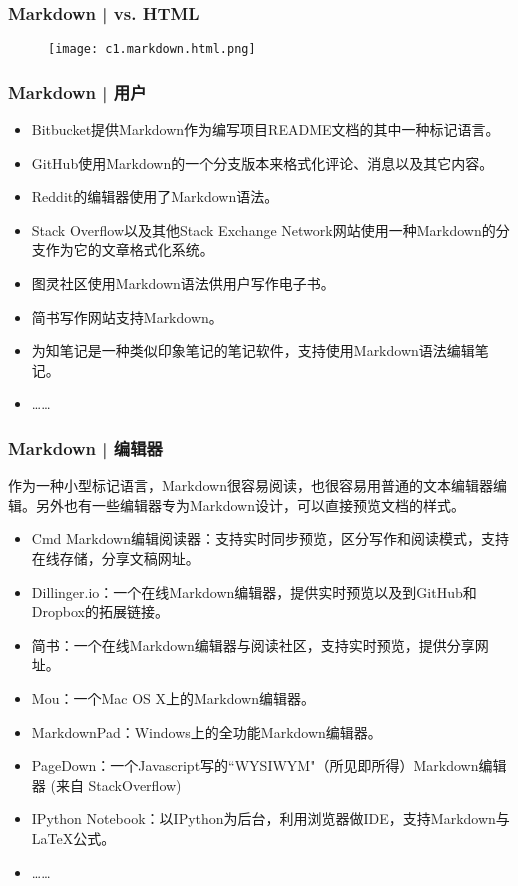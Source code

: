\begin{frame}
  \frametitle{Markdown | vs. HTML}
  \begin{figure}
    \centering
    \texttt{[image: c1.markdown.html.png]}
  \end{figure}
\end{frame}

\begin{frame}
  \frametitle{Markdown | 用户}
  \begin{itemize}
    \item Bitbucket提供Markdown作为编写项目README文档的其中一种标记语言。
    \item GitHub使用Markdown的一个分支版本来格式化评论、消息以及其它内容。
    \item Reddit的编辑器使用了Markdown语法。
    \item Stack Overflow以及其他Stack Exchange Network网站使用一种Markdown的分支作为它的文章格式化系统。
    \item 图灵社区使用Markdown语法供用户写作电子书。
    \item 简书写作网站支持Markdown。
    \item 为知笔记是一种类似印象笔记的笔记软件，支持使用Markdown语法编辑笔记。
    \item ……
  \end{itemize}
\end{frame}

\begin{frame}
  \frametitle{Markdown | 编辑器}
作为一种小型标记语言，Markdown很容易阅读，也很容易用普通的文本编辑器编辑。另外也有一些编辑器专为Markdown设计，可以直接预览文档的样式。
  \begin{itemize}
    \item Cmd Markdown编辑阅读器：支持实时同步预览，区分写作和阅读模式，支持在线存储，分享文稿网址。
    \item Dillinger.io：一个在线Markdown编辑器，提供实时预览以及到GitHub和Dropbox的拓展链接。
    \item 简书：一个在线Markdown编辑器与阅读社区，支持实时预览，提供分享网址。
    \item Mou：一个Mac OS X上的Markdown编辑器。
    \item MarkdownPad：Windows上的全功能Markdown编辑器。
    \item PageDown：一个Javascript写的``WYSIWYM"（所见即所得）Markdown编辑器 (来自 StackOverflow)
    \item IPython Notebook：以IPython为后台，利用浏览器做IDE，支持Markdown与\LaTeX 公式。
    \item ……
  \end{itemize}
\end{frame}

